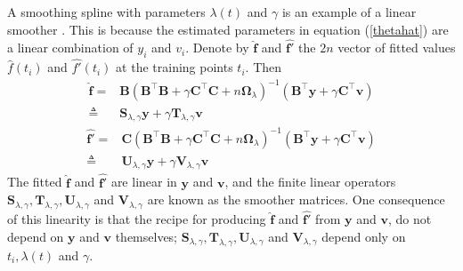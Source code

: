 A smoothing spline with parameters $\lambda(t)$ and $\gamma$ is an example of a linear smoother \citep{esl2009}. This is because the estimated parameters in equation (\ref{thetahat}) are a linear combination of $y_i$ and $v_i$. Denote by $\hat{\mathbf{f}}$ and $\hat{\mathbf{f}'}$ the $2n$ vector of fitted values $\hat{f}(t_i)$ and $\hat{f'}(t_i)$ at the training points $t_i$. Then
\begin{equation}
\begin{split}
\hat{\mathbf{f}} =&\mathbf{B}\left(\mathbf{B}^\top\mathbf{B}+\gamma\mathbf{C}^\top\mathbf{C}+n\mathbf{\Omega}_{\lambda}\right)^{-1}\left(\mathbf{B}^\top\mathbf{y}+\gamma\mathbf{C}^\top\mathbf{v}\right)\\
\triangleq & \mathbf{S}_{\lambda,\gamma}\mathbf{y}+\gamma\mathbf{T}_{\lambda,\gamma}\mathbf{v} 
\end{split}
\end{equation}
\begin{equation}
\begin{split}
\hat{\mathbf{f}'}
=&\mathbf{C}\left(\mathbf{B}^\top\mathbf{B}+\gamma\mathbf{C}^\top\mathbf{C}+n\mathbf{\Omega}_{\lambda}\right)^{-1}\left(\mathbf{B}^\top\mathbf{y}+\gamma\mathbf{C}^\top\mathbf{v}\right)\\
\triangleq&\mathbf{U}_{\lambda,\gamma}\mathbf{y}+\gamma\mathbf{V}_{\lambda,\gamma}\mathbf{v}
\end{split}
\end{equation}
The fitted $\hat{\mathbf{f}}$ and $\hat{\mathbf{f}'}$ are linear in $\mathbf{y}$ and $\mathbf{v}$, and the finite linear operators $\mathbf{S}_{\lambda,\gamma}, \mathbf{T}_{\lambda,\gamma}, \mathbf{U}_{\lambda,\gamma}$ and $\mathbf{V}_{\lambda,\gamma}$ are known as the smoother matrices. One consequence of this linearity is that the recipe for producing $\hat{\mathbf{f}}$ and $\hat{\mathbf{f}'}$ from $\mathbf{y}$ and $\mathbf{v}$, do not depend on $\mathbf{y}$ and $\mathbf{v}$ themselves; $\mathbf{S}_{\lambda,\gamma}, \mathbf{T}_{\lambda,\gamma}, \mathbf{U}_{\lambda,\gamma}$ and $\mathbf{V}_{\lambda,\gamma}$ depend only on $t_i,\lambda(t)$ and $\gamma$.

